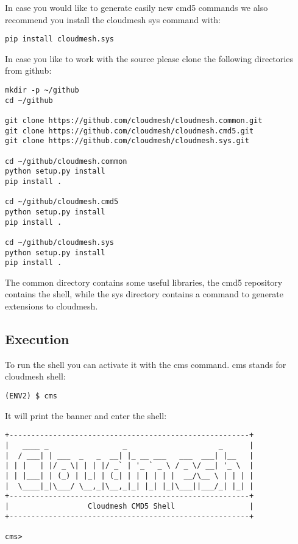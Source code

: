 In case you would like to generate easily new cmd5 commands we also recommend
you install the cloudmesh sys command with:

\begin{verbatim}
pip install cloudmesh.sys
\end{verbatim}

In case you like to work with the source please clone the following
directories from github:

\begin{verbatim}
mkdir -p ~/github
cd ~/github

git clone https://github.com/cloudmesh/cloudmesh.common.git
git clone https://github.com/cloudmesh/cloudmesh.cmd5.git
git clone https://github.com/cloudmesh/cloudmesh.sys.git  

cd ~/github/cloudmesh.common
python setup.py install
pip install .

cd ~/github/cloudmesh.cmd5
python setup.py install
pip install .

cd ~/github/cloudmesh.sys
python setup.py install
pip install .
\end{verbatim}

The common directory contains some useful libraries, the cmd5 repository
contains the shell, while the sys directory contains a command to
generate extensions to cloudmesh.

\subsection{Execution}\label{execution}

To run the shell you can activate it with the cms command. cms stands
for cloudmesh shell:

\begin{verbatim}
(ENV2) $ cms
\end{verbatim}

It will print the banner and enter the shell:

\begin{verbatim}
+-------------------------------------------------------+
|   ____ _                 _                     _      |
|  / ___| | ___  _   _  __| |_ __ ___   ___  ___| |__   |
| | |   | |/ _ \| | | |/ _` | '_ ` _ \ / _ \/ __| '_ \  |
| | |___| | (_) | |_| | (_| | | | | | |  __/\__ \ | | | |
|  \____|_|\___/ \__,_|\__,_|_| |_| |_|\___||___/_| |_| |
+-------------------------------------------------------+
|                  Cloudmesh CMD5 Shell                 |
+-------------------------------------------------------+

cms>
\end{verbatim}

